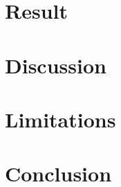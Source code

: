 \documentclass[10pt, conference]{IEEEtran}
\begin{document}
\section{Result}\label{s:result}





\section{Discussion}\label{s:disc}




\section{Limitations}\label{s:limit}




\section{Conclusion}\label{s:conclusion}



\balance


\end{document}
